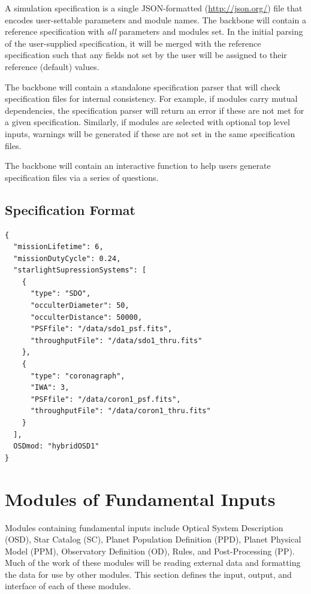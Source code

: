 \documentclass[]{asme2ej}
\begin{document}
A simulation specification is a single JSON-formatted (\url{http://json.org/}) file that encodes user-settable parameters and module names.  The backbone will contain a reference specification with \emph{all} parameters and modules set.  In the initial parsing of the user-supplied specification, it will be merged with the reference specification such that any fields not set by the user will be assigned to their reference (default) values. 

The backbone will contain a standalone specification parser that will check specification files for internal consistency.  For example, if modules carry mutual dependencies, the specification parser will return an error if these are not met for a given specification.  Similarly, if modules are selected with optional top level inputs, warnings will be generated if these are not set in the same specification files.

The backbone will contain an interactive function to help users generate specification files via a series of questions.

\subsection{Specification Format}
\begin{verbatim}
{
  "missionLifetime": 6,
  "missionDutyCycle": 0.24,
  "starlightSupressionSystems": [
    {
      "type": "SDO",
      "occulterDiameter": 50,
      "occulterDistance": 50000,
      "PSFfile": "/data/sdo1_psf.fits",
      "throughputFile": "/data/sdo1_thru.fits"
    },
    {
      "type": "coronagraph",
      "IWA": 3,
      "PSFfile": "/data/coron1_psf.fits",
      "throughputFile": "/data/coron1_thru.fits"
    }
  ],
  OSDmod: "hybridOSD1"
}
\end{verbatim}


\section{Modules of Fundamental Inputs}\label{sec:modules}
Modules containing fundamental inputs include Optical System Description (OSD), Star Catalog (SC), Planet Population Definition (PPD), Planet Physical Model (PPM), Observatory Definition (OD), Rules, and Post-Processing (PP). Much of the work of these modules will be reading external data and formatting the data for use by other modules. This section defines the input, output, and interface of each of these modules.
\end{document}
